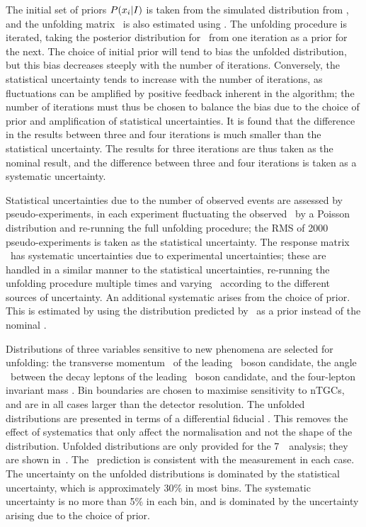 The initial set of priors $P(x_i|I)$ is taken from the simulated distribution from
\mc, and the unfolding matrix \unfA\ is also estimated using \mcsim. The
unfolding
procedure is iterated, taking the posterior distribution for \unfx\ from one iteration as a
prior for the next. The choice of initial prior will tend to bias the unfolded
distribution, but this bias decreases steeply with the number of iterations.
Conversely, the
statistical uncertainty tends to increase with the number of iterations, as
fluctuations can be amplified by positive feedback inherent in the algorithm;
the number of iterations must thus be chosen to balance the bias due to the
choice of prior and amplification of statistical uncertainties. It is found that
the difference in the results between three and four iterations is much smaller than
the statistical uncertainty. The results for three iterations are thus taken as
the nominal result, and the difference between three and four iterations is
taken as a systematic uncertainty. 

Statistical uncertainties due to the number of observed events are assessed by
pseudo-experiments, in each experiment fluctuating the observed \unfy\ by a
Poisson distribution and re-running the full unfolding procedure; the RMS of 2000
pseudo-experiments is taken as the statistical uncertainty. 
The response matrix \unfA\ has systematic uncertainties due to experimental
uncertainties; these are handled in a similar manner to the statistical
uncertainties, re-running the unfolding procedure multiple times and varying 
\unfA\ according to the different sources of uncertainty. An
additional systematic arises from the choice of prior. This is estimated by
using the distribution predicted by \sherpa\ as a prior instead of the nominal
\powhegbox. 

Distributions of three variables sensitive to new phenomena are selected for
unfolding: the transverse momentum \ptZ\ of the leading \Z\ boson candidate, the
angle \deltaPhiLL\ between the decay leptons of the leading \Z\ boson candidate,
and the four-lepton invariant mass \mZZ. Bin boundaries are chosen to maximise
sensitivity to nTGCs, and are in all cases larger than the detector resolution.
The unfolded distributions are presented in terms of a differential fiducial
\cx. This removes the effect of systematics that only affect the normalisation
and not the shape of the distribution. Unfolded distributions are only provided
for the 7~\tev\ analysis; they are shown in~.  The
\sm\ prediction is consistent with the measurement in each case. The
uncertainty on the unfolded distributions is dominated by the statistical
uncertainty, which is approximately 30\% in most bins. The systematic
uncertainty is no more than 5\% in each bin, and is dominated by the
uncertainty arising due to the choice of prior.

